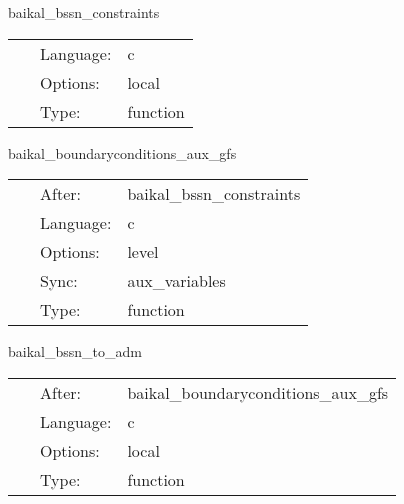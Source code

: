 \vspace{5mm}


\hspace{5mm} baikal\_bssn\_constraints 

\hspace{5mm}{\it compute bssn (hamiltonian and momentum) constraints } 


\hspace{5mm}

 \begin{tabular*}{160mm}{cll} 
~ & Language:  & c \\ 
~ & Options:  & local \\ 
~ & Type:  & function \\ 
\end{tabular*} 


\vspace{5mm}


\hspace{5mm} baikal\_boundaryconditions\_aux\_gfs 

\hspace{5mm}{\it enforce symmetry bcs in constraint computation } 


\hspace{5mm}

 \begin{tabular*}{160mm}{cll} 
~ & After:  & baikal\_bssn\_constraints \\ 
~ & Language:  & c \\ 
~ & Options:  & level \\ 
~ & Sync:  & aux\_variables \\ 
~ & Type:  & function \\ 
\end{tabular*} 


\vspace{5mm}


\hspace{5mm} baikal\_bssn\_to\_adm 

\hspace{5mm}{\it perform bssn-to-adm conversion in mol\_pseudoevolution. needed for proper hydrobase integration. } 


\hspace{5mm}

 \begin{tabular*}{160mm}{cll} 
~ & After:  & baikal\_boundaryconditions\_aux\_gfs \\ 
~ & Language:  & c \\ 
~ & Options:  & local \\ 
~ & Type:  & function \\ 
\end{tabular*} 


